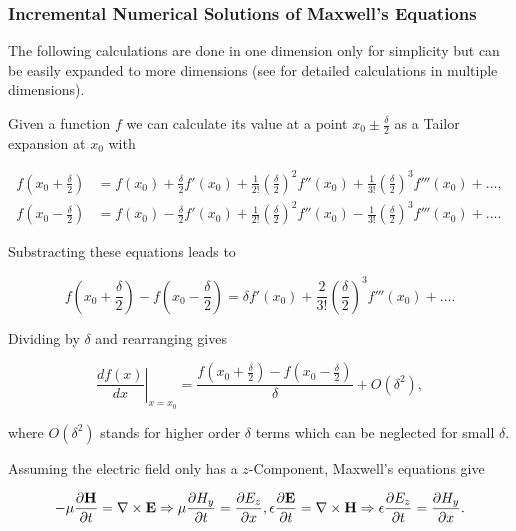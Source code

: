 \subsubsection{Incremental Numerical Solutions of Maxwell's Equations}

The following calculations are done in one dimension only for simplicity but can be easily expanded to more dimensions (see \cite{numel} for detailed calculations in multiple dimensions).

Given a function $f$ we can calculate its value at a point $x_0\pm\frac{\delta}{2}$ as a Tailor expansion at $x_0$ with

\begin{align}
  f\left(x_0+\frac{\delta}{2}\right)&=f(x_0)+\frac{\delta}{2}f'(x_0)+\frac{1}{2!}\left(\frac{\delta}{2}\right)^2f''(x_0)+\frac{1}{3!}\left(\frac{\delta}{2}\right)^3f'''(x_0)+\dots,\\
  f\left(x_0-\frac{\delta}{2}\right)&=f(x_0)-\frac{\delta}{2}f'(x_0)+\frac{1}{2!}\left(\frac{\delta}{2}\right)^2f''(x_0)-\frac{1}{3!}\left(\frac{\delta}{2}\right)^3f'''(x_0)+\dots.
\end{align}

Substracting these equations leads to

\begin{equation}
  f\left(x_0+\frac{\delta}{2}\right)-f\left(x_0-\frac{\delta}{2}\right)=\delta f'(x_0)+\frac{2}{3!}\left(\frac{\delta}{2}\right)^3f'''(x_0)+\dots.
\end{equation}

Dividing by $\delta$ and rearranging gives

\begin{equation}
  \left.\frac{df(x)}{dx}\right|_{x=x_0} = \frac{f(x_0+\frac{\delta}{2})-f(x_0-\frac{\delta}{2})}{\delta} + O(\delta^2),
\end{equation}

where $O(\delta^2)$ stands for higher order $\delta$ terms which can be neglected for small $\delta$.

Assuming the electric field only has a $z$-Component, Maxwell's equations give

\begin{equation}
  -\mu\frac{\partial\mathbf{H}}{\partial t}=\nabla\times\mathbf{E} \Rightarrow \mu\frac{\partial H_y}{\partial t} = \frac{\partial E_z}{\partial x},\\
  \epsilon\frac{\partial\mathbf{E}}{\partial t}=\nabla\times\mathbf{H} \Rightarrow \epsilon\frac{\partial E_z}{\partial t} = \frac{\partial H_y}{\partial x}.
\end{equation}
